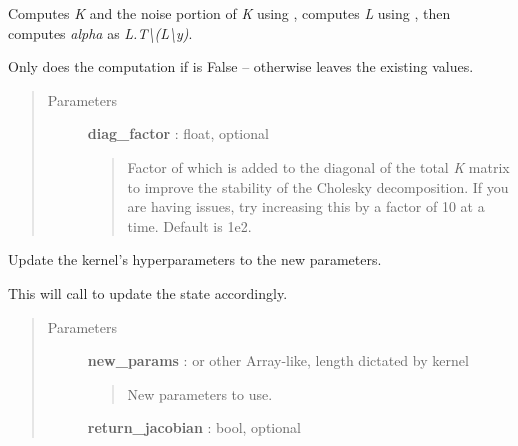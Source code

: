 \documentclass[letterpaper,10pt,english]{sphinxmanual}
\begin{document}
\begin{fulllineitems}
\begin{fulllineitems}
Computes \emph{K} and the noise portion of \emph{K} using {\hyperref[gptools:gptools.gaussian_process.GaussianProcess.compute_Kij]{}},
computes \emph{L} using , then computes
\emph{alpha} as \emph{L.T\textbackslash{}(L\textbackslash{}y)}.

Only does the computation if  is False --
otherwise leaves the existing values.
\begin{quote}\begin{description}
\item[{Parameters }] \leavevmode
\textbf{diag\_factor} : float, optional
\begin{quote}

Factor of  which is added to
the diagonal of the total \emph{K} matrix to improve the stability of
the Cholesky decomposition. If you are having issues, try increasing
this by a factor of 10 at a time. Default is 1e2.
\end{quote}

\end{description}\end{quote}

\end{fulllineitems}


\begin{fulllineitems}
\label{gptools:gptools.gaussian_process.GaussianProcess.update_hyperparameters}
Update the kernel's hyperparameters to the new parameters.

This will call {\hyperref[gptools:gptools.gaussian_process.GaussianProcess.compute_K_L_alpha_ll]{}} to update the state
accordingly.
\begin{quote}\begin{description}
\item[{Parameters }] \leavevmode
\textbf{new\_params} :  or other Array-like, length dictated by kernel
\begin{quote}

New parameters to use.
\end{quote}

\textbf{return\_jacobian} : bool, optional
\begin{quote}


\end{quote}
\end{description}
\end{quote}
\end{fulllineitems}
\end{fulllineitems}
\end{document}
